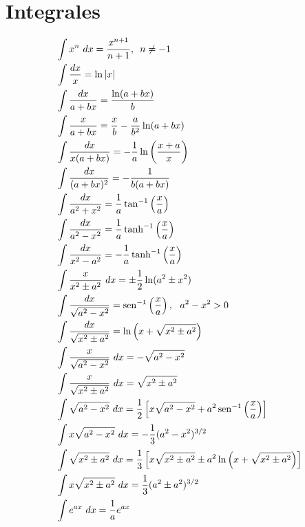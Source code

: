  
\chapter*{Integrales}

\begin{minipage}[c]{0.5\textwidth}
\begin{align*}
& \int x^n\,\,dx = \frac{x^{n+1}}{n+1} , \,\,\,n \neq -1\\
& \int \frac{dx}{x} = \ln |x|\\
& \int \frac{dx}{a+bx} = \frac{\ln (a+bx)}{b}\\
& \int \frac{x}{a+bx} = \frac{x}{b} - \frac{a}{b^2}\ln(a+bx)\\
& \int \frac{dx}{x(a+bx)} = -\frac{1}{a}\ln\left( \frac{x+a}{x} \right)\\
& \int \frac{dx}{(a+bx)^2} = -\frac{1}{b(a+bx)}\\
& \int \frac{dx}{a^2+x^2} = \frac{1}{a}\tan^{-1} \left( \frac{x}{a} \right)\\
& \int \frac{dx}{a^2-x^2} = \frac{1}{a}\tanh^{-1} \left( \frac{x}{a} \right)\\
& \int \frac{dx}{x^2-a^2} = -\frac{1}{a}\tanh^{-1} \left( \frac{x}{a} \right)\\
& \int \frac{x}{x^2 \pm a^2}\,\,dx = \pm \frac{1}{2} \ln (a^2\pm x^2)\\
& \int \frac{dx}{\sqrt{a^2 - x^2}} =  \operatorname{sen}^{-1} \left( \frac{x}{a} \right),\,\,\,\,a^2-x^2 >0\\
& \int \frac{dx}{\sqrt{x^2 \pm a^2}} =  \ln \left( x+\sqrt{x^2 \pm a^2} \right)\\
& \int \frac{x}{\sqrt{a^2 - x^2}}\,\,dx = -\sqrt{a^2-x^2}\\
& \int \frac{x}{\sqrt{x^2 \pm a^2}}\,\,dx = \sqrt{x^2 \pm a^2}\\
& \int \sqrt{a^2 - x^2}\,\,dx = \frac{1}{2}\left[ x\sqrt{a^2-x^2} + a^2\operatorname{sen}^{-1} \left( \frac{x}{a} \right) \right] \\
& \int x\sqrt{a^2 - x^2}\,\,dx =  -\frac{1}{3}(a^2-x^2)^{3/2}\\
& \int \sqrt{x^2 \pm a^2}\,\,dx =  \frac{1}{3} \left[ x\sqrt{x^2 \pm a^2} \pm a^2\ln \left(x+\sqrt{x^2 \pm a^2} \right) \right] \\
& \int x\sqrt{x^2 \pm a^2}\,\,dx =  \frac{1}{3}(a^2\pm a^2)^{3/2}\\
& \int e^{ax}\,\,dx = \frac{1}{a}e^{ax}
\end{align*}
\end{minipage}
